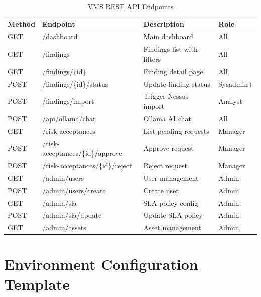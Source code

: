 \begin{table}[H]
\centering
\caption{VMS REST API Endpoints}
\label{tab:api}
\begin{tabularx}{\linewidth}{llXl}
\toprule
\textbf{Method} & \textbf{Endpoint} & \textbf{Description} & \textbf{Role} \\
\midrule
GET & /dashboard & Main dashboard & All \\
GET & /findings & Findings list with filters & All \\
GET & /findings/\{id\} & Finding detail page & All \\
POST & /findings/\{id\}/status & Update finding status & Sysadmin+ \\
POST & /findings/import & Trigger Nessus import & Analyst \\
POST & /api/ollama/chat & Ollama AI chat & All \\
GET & /risk-acceptances & List pending requests & Manager \\
POST & /risk-acceptances/\{id\}/approve & Approve request & Manager \\
POST & /risk-acceptances/\{id\}/reject & Reject request & Manager \\
GET & /admin/users & User management & Admin \\
POST & /admin/users/create & Create user & Admin \\
GET & /admin/sla & SLA policy config & Admin \\
POST & /admin/sla/update & Update SLA policy & Admin \\
GET & /admin/assets & Asset management & Admin \\
\bottomrule
\end{tabularx}
\end{table}

\chapter{Environment Configuration Template}
\label{app:env}


